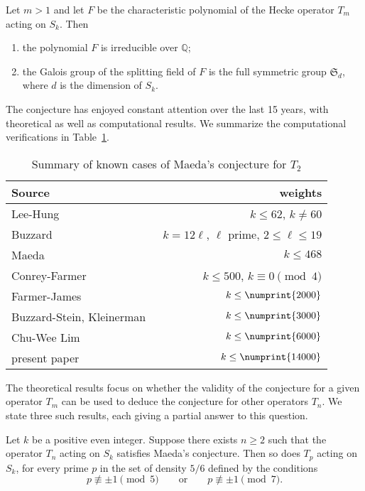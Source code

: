 \documentclass{book}
\newcommand{\QQ}{\mathbb{Q}}
\renewcommand{\SS}{\mathfrak{S}}
\newcommand{\bound}{\numprint{14000}}
\begin{document}
\begin{conjecture}
  Let $m>1$ and 
  let $F$ be the characteristic polynomial of the Hecke operator $T_m$ acting
  on $S_k$.  Then 
  \begin{enumerate}
    \item the polynomial $F$ is irreducible over $\QQ$;
    \item the Galois group of the splitting field of $F$ is the full symmetric
      group $\SS_d$, where $d$ is the dimension of $S_k$.
  \end{enumerate}
\end{conjecture}

The conjecture has enjoyed constant attention over the last 15 years, with
theoretical as well as computational results.  We summarize the computational
verifications in Table~\ref{tbl:known}.

\begin{table}[h]
  \begin{center}
\begin{tabular}{l|r}
  Source & weights\\ \hline
  Lee-Hung~\cite{LeeHung} & $k\leq 62$, $k\neq 60$ \\
  Buzzard~\cite{Buzzard} & $k=12\ell$, $\ell$ prime, $2\leq\ell\leq 19$ \\
  Maeda~\cite{HidaMaeda} & $k\leq 468$ \\
  Conrey-Farmer~\cite{ConreyFarmer} & $k\leq 500$, $k\equiv 0\pmod 4$  \\
  Farmer-James~\cite{FarmerJames} & $k\leq \numprint{2000}$  \\
  Buzzard-Stein, Kleinerman~\cite{Kleinerman} & $k\leq\numprint{3000}$ \\
  Chu-Wee Lim~\cite{Lim} & $k\leq\numprint{6000}$ \\
  present paper & $k\leq\bound$  \\
\end{tabular}
\end{center}
\caption{Summary of known cases of Maeda's conjecture for $T_2$}
\label{tbl:known}
\end{table}

The theoretical results focus on whether the validity of the conjecture for
a given operator $T_m$ can be used to deduce the conjecture for other
operators $T_n$.  We state three such results, each giving a partial answer to
this question.

\begin{theorem}
  \label{thm:CFW}
  Let $k$ be a positive even integer.  Suppose there exists $n\geq 2$ such
  that the operator $T_n$ acting on $S_k$ satisfies Maeda's conjecture.  Then
  so does $T_p$ acting on $S_k$, for every prime $p$ in the set of density
  $5/6$ defined by the conditions
  \begin{equation*}
    p\not\equiv \pm 1\pmod{5}\qquad\text{or}\qquad
    p\not\equiv \pm 1\pmod{7}.
  \end{equation*}
\end{theorem}
\end{document}

